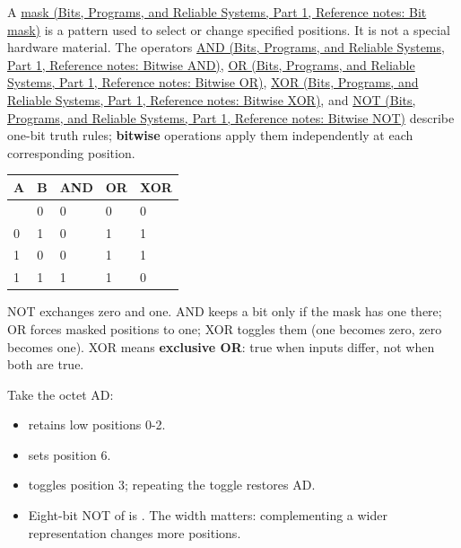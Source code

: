 \hypertarget{05-engine-i-ch001-a-mask-selects-positions}{}

A \href{../01-Bits-Programs-and-Reliable-Systems-P01/main.pdf\#nameddest=appendix-dbe5905163c2}{mask (Bits, Programs, and Reliable Systems, Part 1, Reference notes: Bit mask)} is a pattern used to select or change specified positions. It is not a special hardware material. The operators \href{../01-Bits-Programs-and-Reliable-Systems-P01/main.pdf\#nameddest=appendix-68b52453737c}{AND (Bits, Programs, and Reliable Systems, Part 1, Reference notes: Bitwise AND)}, \href{../01-Bits-Programs-and-Reliable-Systems-P01/main.pdf\#nameddest=appendix-a427ce8ce8a6}{OR (Bits, Programs, and Reliable Systems, Part 1, Reference notes: Bitwise OR)}, \href{../01-Bits-Programs-and-Reliable-Systems-P01/main.pdf\#nameddest=appendix-d49161831368}{XOR (Bits, Programs, and Reliable Systems, Part 1, Reference notes: Bitwise XOR)}, and \href{../01-Bits-Programs-and-Reliable-Systems-P01/main.pdf\#nameddest=appendix-8f38927cfc54}{NOT (Bits, Programs, and Reliable Systems, Part 1, Reference notes: Bitwise NOT)} describe one-bit truth rules; \textbf{bitwise} operations apply them independently at each corresponding position.

{\def\LTcaptype{none} %
\begin{longtable}[]{@{}lllll@{}}
\toprule\noalign{}
A & B & AND & OR & XOR \\
\midrule\noalign{}
\endhead
\bottomrule\noalign{}
\endlastfoot
0 & 0 & 0 & 0 & 0 \\
0 & 1 & 0 & 1 & 1 \\
1 & 0 & 0 & 1 & 1 \\
1 & 1 & 1 & 1 & 0 \\
\end{longtable}
}

NOT exchanges zero and one. AND keeps a bit only if the mask has one there; OR forces masked positions to one; XOR toggles them (one becomes zero, zero becomes one). XOR means \textbf{exclusive OR}: true when inputs differ, not when both are true.

Take the octet AD:

\begin{itemize}
\tightlist
\item
   retains low positions 0-2.
\item
   sets position 6.
\item
   toggles position 3; repeating the toggle restores AD.
\item
  Eight-bit NOT of  is . The width matters: complementing a wider representation changes more positions.
\end{itemize}

